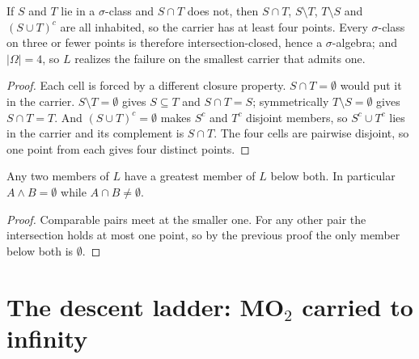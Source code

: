 \begin{theorem}
  \label{thm:interclosed-needs-four}
  \leanok
  If $S$ and $T$ lie in a $\sigma$-class and $S \cap T$ does not, then
  $S \cap T$, $S \setminus T$, $T \setminus S$ and $(S \cup T)^{c}$ are all
  inhabited, so the carrier has at least four points. Every $\sigma$-class on
  three or fewer points is therefore intersection-closed, hence a
  $\sigma$-algebra; and $|\Omega| = 4$, so $L$ realizes the failure on the
  smallest carrier that admits one.
\end{theorem}

\begin{proof}
  \leanok
  Each cell is forced by a different closure property. $S \cap T = \emptyset$
  would put it in the carrier. $S \setminus T = \emptyset$ gives $S \subseteq T$
  and $S \cap T = S$; symmetrically $T \setminus S = \emptyset$ gives
  $S \cap T = T$. And $(S \cup T)^{c} = \emptyset$ makes $S^{c}$ and $T^{c}$
  disjoint members, so $S^{c} \cup T^{c}$ lies in the carrier and its complement
  is $S \cap T$. The four cells are pairwise disjoint, so one point from each
  gives four distinct points.
\end{proof}
\begin{theorem}
  \label{thm:concrete-mo2-meets}
  \leanok
  Any two members of $L$ have a greatest member of $L$ below both. In
  particular $A \wedge B = \emptyset$ while $A \cap B \neq \emptyset$.
\end{theorem}

\begin{proof}
  \leanok
  Comparable pairs meet at the smaller one. For any other pair the intersection
  holds at most one point, so by the previous proof the only member below both
  is $\emptyset$.
\end{proof}

\section{The descent ladder: MO$_2$ carried to infinity}

